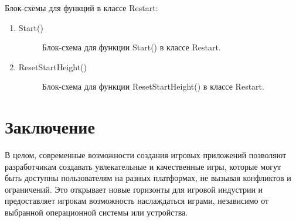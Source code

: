 \documentclass[14pt, oneside]{altsu-report}
\begin{document}
Блок-схемы для функций в классе Restart:
\begin{enumerate}
\item Start()

\begin{figure}[H]
\caption{Блок-схема для функции  Start() в классе Restart.}
\end{figure}

\item ResetStartHeight()

\begin{figure}[H]
\caption{Блок-схема для функции  ResetStartHeight() в классе Restart.}
\end{figure}

\end{enumerate}


\chapter*{Заключение}

В целом, современные возможности создания игровых приложений позволяют разработчикам создавать увлекательные и качественные игры, которые могут быть доступны пользователям на разных платформах, не вызывая конфликтов и ограничений. Это открывает новые горизонты для игровой индустрии и предоставляет игрокам возможность наслаждаться играми, независимо от выбранной операционной системы или устройства.
\end{document}

